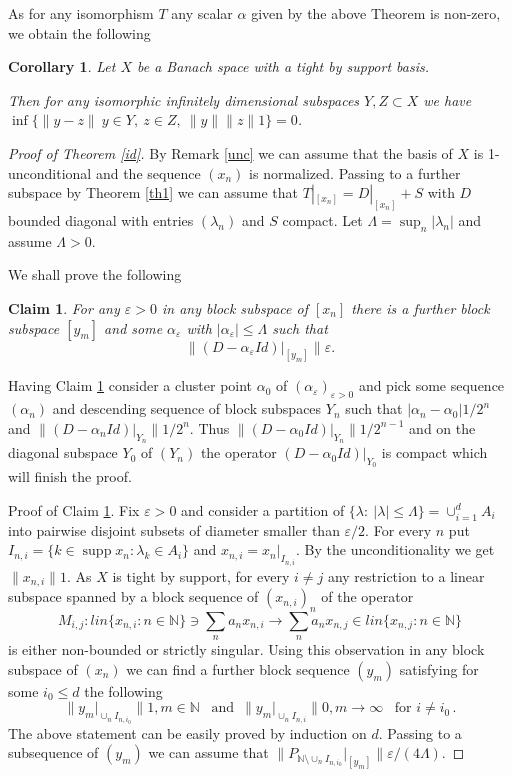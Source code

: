 \documentclass{amsart}
\newtheorem{corollary}[theorem]{Corollary}
\newtheorem{claim}{Claim}
\numberwithin{subsection}{section}
\numberwithin{equation}{section}
\begin{document}
As for any isomorphism $T$ any scalar $\alpha$ given by the above Theorem is non-zero, we obtain the following 
\begin{corollary}\label{cor}
Let $X$ be a Banach space with a tight by support basis. 

Then for any isomorphic infinitely dimensional subspaces $Y,Z\subset X$  we have $\inf\{{\lVert y-z\rVert} \ y\in Y, \ z\in Z, \ {\lVert y\rVert}{\lVert z\rVert}1 \}=0$. 
\end{corollary}
\begin{proof}[Proof of Theorem \ref{id}] By Remark \ref{unc} we can assume that the basis of $X$ is 1-unconditional and the sequence $(x_n)$ is normalized. Passing to a further subspace by Theorem \ref{th1} we can assume that $T|_{[x_n]}=D|_{[x_n]}+S$ with $D$ bounded diagonal with entries $(\lambda_n)$ and $S$ compact.  Let $\Lambda=\sup_n|\lambda_n|$ and assume $\Lambda >0$. 

We shall prove the following
\begin{claim}\label{claim1}
For any ${\varepsilon}>0$ in any block subspace of $[x_n]$ there is a further block subspace $[y_m]$ and some $\alpha_{\varepsilon}$ with $|\alpha_{\varepsilon}|\leq\Lambda$ such that 
$$
{\lVert (D-\alpha_{\varepsilon} Id)|_{[y_m]}\rVert}{\varepsilon}.
$$
\end{claim}
Having Claim \ref{claim1} consider a cluster point $\alpha_0$ of $(\alpha_{\varepsilon})_{{\varepsilon}>0}$ and pick some sequence $(\alpha_n)$ and descending sequence of block subspaces $Y_n$ such that ${\vert \alpha_n-\alpha_0\vert}1/2^n$ and ${\lVert (D-\alpha_n Id)|_{Y_n}\rVert}1/2^n$. Thus ${\lVert (D-\alpha_0 Id)|_{Y_n}\rVert}1/2^{n-1}$ and on the diagonal subspace $Y_0$ of $(Y_n)$ the operator $(D-\alpha_0 Id)|_{Y_0}$ is compact which will finish the proof.

Proof of Claim \ref{claim1}. Fix ${\varepsilon}>0$  and  consider a partition  of $\{\lambda: \ |\lambda|\leq \Lambda\}=\cup_{i=1}^{d}A_i$ into pairwise disjoint subsets of diameter smaller than ${\varepsilon}/2$. For every $n$ put $I_{n,i}=\{k\in\operatorname{supp} x_n: \lambda_{k}\in A_i\}$ and $x_{n,i}=x_{n}{|}_{I_{n,i}}$. By the unconditionality  we get ${\lVert x_{n,i}\rVert} 1$. As $X$ is tight by support, for every $i\ne j$ any restriction to a linear subspace spanned by a block sequence of $(x_{n,i})_n$ of the operator
$$
M_{i,j}:lin\{x_{n,i}: n\in{{\mathbb{N}}}\}\ni\sum_na_nx_{n,i}\to \sum_na_nx_{n,j}\in lin\{x_{n,j}: n\in{{\mathbb{N}}}\}
$$
is either non-bounded or strictly singular. Using this observation in any block subspace of $(x_n)$ we can find a further block sequence $(y_m)$ satisfying for some $i_{0}\leq d$ the following
$$
{\lVert y_m|_{\cup_nI_{n,i_{0}}}\rVert}1, m\in{{\mathbb{N}}}\,\,\, \text{ and} \,\,\,{\lVert y_m|_{\cup_nI_{n,i}}\rVert} 0, m\to\infty \,\,\,\text{ for } i\neq i_0\,.
$$
The above statement can be easily proved by induction on $d$. Passing to a subsequence of $(y_m)$ we can assume that ${\lVert P_{{{\mathbb{N}}}\setminus\cup_nI_{n,i_0}}|_{[y_m]}\rVert}{\varepsilon}/(4\Lambda)$.


\end{proof}
\end{document}
